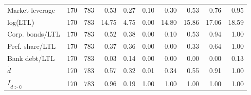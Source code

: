\begin{threeparttable}
\begin{tabular}{lrrrrrrrrr}
Market leverage & 170 & 783 & 0.53 & 0.27 & 0.10 & 0.30 & 0.53 & 0.76 & 0.95 \\
log(LTL) & 170 & 783 & 14.75 & 4.75 & 0.00 & 14.80 & 15.86 & 17.06 & 18.59 \\
Corp. bonds/LTL & 170 & 783 & 0.52 & 0.38 & 0.00 & 0.10 & 0.53 & 0.94 & 1.00 \\
Pref. share/LTL & 170 & 783 & 0.37 & 0.36 & 0.00 & 0.00 & 0.33 & 0.64 & 1.00 \\
Bank debt/LTL & 170 & 783 & 0.03 & 0.14 & 0.00 & 0.00 & 0.00 & 0.00 & 0.13 \\
\ensuremath{\tilde{d}} & 170 & 783 & 0.57 & 0.32 & 0.01 & 0.34 & 0.55 & 0.91 & 1.00 \\
\ensuremath{I_{\tilde{d}>0}} & 170 & 783 & 0.96 & 0.19 & 1.00 & 1.00 & 1.00 & 1.00 & 1.00 \\
\bottomrule\end{tabular}\end{threeparttable}
